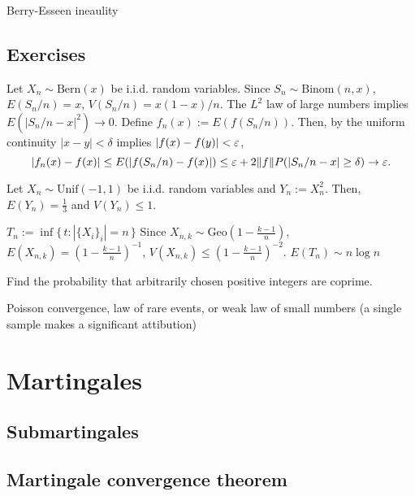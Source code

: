 \documentclass{../note}
\def\Unif{\mathrm{Unif}}
\def\Bern{\mathrm{Bern}}
\def\Binom{\mathrm{Binom}}
\def\Geo{\mathrm{Geo}}
\begin{document}

Berry-Esseen ineaulity






\section*{Exercises}
\begin{prb}
Let $X_n\sim\Bern(x)$ be i.i.d. random variables.
Since $S_n\sim\Binom(n,x)$, $E(S_n/n)=x$, $V(S_n/n)=x(1-x)/n$.
The $L^2$ law of large numbers implies $E(|S_n/n-x|^2)\to0$.
Define $f_n(x):=E(f(S_n/n))$.
Then, by the uniform continuity $|x-y|<\delta$ implies $|f(x)-f(y)|<\varepsilon$,
\[|f_n(x)-f(x)|\le E(|f(S_n/n)-f(x)|)\le\varepsilon+2\|f\|P(|S_n/n-x|\ge\delta)\to\varepsilon.\]
\end{prb}
\begin{prb}
Let $X_n\sim\Unif(-1,1)$ be i.i.d. random variables and $Y_n:=X_n^2$.
Then, $E(Y_n)=\frac13$ and $V(Y_n)\le1$.
\end{prb}
\begin{prb}
$T_n:=\inf\{\,t:|\{X_i\}_i|=n\,\}$
Since $X_{n,k}\sim\Geo(1-\frac{k-1}n)$, $E(X_{n,k})=(1-\frac{k-1}n)^{-1}$, $V(X_{n,k})\le(1-\frac{k-1}n)^{-2}$.
$E(T_n)\sim n\log n$
\end{prb}
\begin{prb}
\end{prb}

\begin{prb}
Find the probability that arbitrarily chosen positive integers are coprime.
\end{prb}
Poisson convergence, law of rare events, or weak law of small numbers (a single sample makes a significant attibution)









\chapter{Martingales}
\section{Submartingales}
\section{Martingale convergence theorem}
\begin{prb}
\begin{parts}
\item
\end{parts}
\end{prb}
\end{document}
